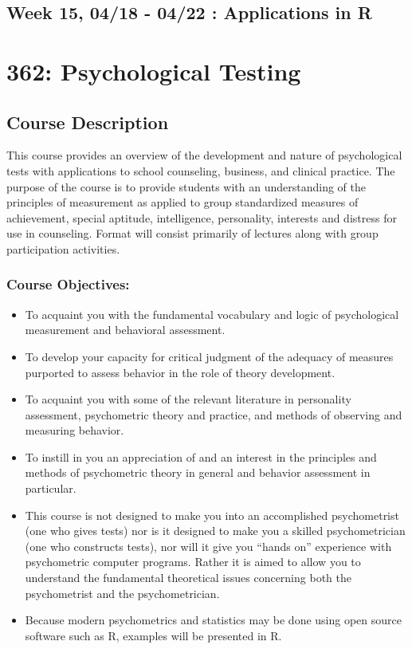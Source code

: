 \hypertarget{week-15-0418---0422-applications-in-r}{%
\section{Week 15, 04/18 - 04/22 : Applications in R}\label{week-15-0418---0422-applications-in-r}}

\hypertarget{testing}{%
\chapter*{362: Psychological Testing}\label{testing}}


\hypertarget{course-description-2}{%
\section{Course Description}\label{course-description-2}}

This course provides an overview of the development and nature of psychological tests with applications to school counseling, business, and clinical practice. The purpose of the course is to provide students with an understanding of the principles of measurement as applied to group standardized measures of achievement, special aptitude, intelligence, personality, interests and distress for use in counseling. Format will consist primarily of lectures along with group participation activities.

\hypertarget{course-objectives}{%
\subsection{Course Objectives:}\label{course-objectives}}

\begin{itemize}
\tightlist
\item
  To acquaint you with the fundamental vocabulary and logic of psychological measurement and behavioral assessment.
\item
  To develop your capacity for critical judgment of the adequacy of measures purported to assess behavior in the role of theory development.
\item
  To acquaint you with some of the relevant literature in personality assessment, psychometric theory and practice, and methods of observing and measuring behavior.
\item
  To instill in you an appreciation of and an interest in the principles and methods of psychometric theory in general and behavior assessment in particular.
\item
  This course is not designed to make you into an accomplished psychometrist (one who gives tests) nor is it designed to make you a skilled psychometrician (one who constructs tests), nor will it give you ``hands on'' experience with psychometric computer programs. Rather it is aimed to allow you to understand the fundamental theoretical issues concerning both the psychometrist and the psychometrician.
\item
  Because modern psychometrics and statistics may be done using open source software such as R, examples will be presented in R.
\end{itemize}


